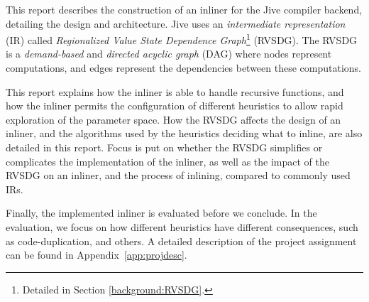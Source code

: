 This report describes the construction of an inliner for the Jive compiler
backend, detailing the design and architecture. Jive uses an
\textit{intermediate representation} (IR) called \textit{Regionalized Value
State Dependence Graph}\footnote{Detailed in Section \ref{background:RVSDG}.}
(RVSDG). The RVSDG~\cite{RVSDG:HiPEACpaper} is a \textit{demand-based} and
\textit{directed acyclic graph} (DAG) where nodes represent computations, and
edges represent the dependencies between these computations.


This report explains how the inliner is able to handle recursive functions, and
how the inliner permits the configuration of different heuristics to allow rapid
exploration of the parameter space. How the RVSDG affects the design of an
inliner, and the algorithms used by the heuristics deciding what to inline, are
also detailed in this report. Focus is put on whether the RVSDG simplifies or
complicates the implementation of the inliner, as well as the impact of the
RVSDG on an inliner, and the process of inlining, compared to commonly used IRs.

Finally, the implemented inliner is evaluated before we conclude. In the
evaluation, we focus on how different heuristics have different consequences,
such as code-duplication, and others. A detailed description of the project
assignment can be found in Appendix~\ref{app:projdesc}.
